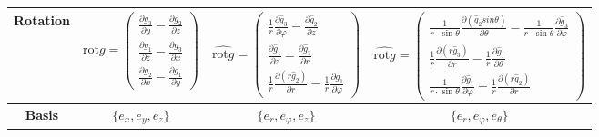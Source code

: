 \documentclass[6pt,a4paper]{scrartcl}
\begin{document}
\begin{center}
\begin{tabular}{|c|c|c|c|}
        \hline
        \textbf{Rotation}         & $\text{rot}g=\begin{pmatrix} \frac{\partial g_3}{\partial y}-\frac{\partial g_2}{\partial z} \\ \frac{\partial g_1}{\partial z}-\frac{\partial g_3}{\partial x} \\ \frac{\partial g_2}{\partial x}-\frac{\partial g_1}{\partial y} \end{pmatrix}$                                                                      & $\widehat{\text{rot}g}=\begin{pmatrix} \frac{1}{r}\frac{\partial\hat{g}_3}{\partial\varphi}-\frac{\partial\hat{g}_2}{\partial z} \\ \frac{\partial\hat{g}_1}{\partial z}-\frac{\partial\hat{g}_3}{\partial r} \\ \frac{1}{r}\frac{\partial(r\hat{g}_2)}{\partial r}-\frac{1}{r}\frac{\partial\hat{g}_1}{\partial\varphi} \end{pmatrix}$                                                                                                                                                                  & $\widehat{\text{rot}g}=\begin{pmatrix} \frac{1}{r\cdot\sin\theta}\frac{\partial(\hat{g}_2sin\theta)}{\partial\theta}-\frac{1}{r\cdot\sin\theta}\frac{\partial\hat{g}_3}{\partial\varphi} \\ \frac{1}{r}\frac{\partial(r\hat{g}_3)}{\partial r}-\frac{1}{r}\frac{\partial\hat{g}_1}{\partial\theta} \\ \frac{1}{r\cdot\sin\theta}\frac{\partial\hat{g}_1}{\partial\varphi}-\frac{1}{r}\frac{\partial(r\hat{g}_2)}{\partial r} \end{pmatrix}$                                                                                                                                                                                                                                                                     \\
        \hline
        \textbf{Basis}            & $\{e_x,e_y,e_z\}$                                                                                             & $\{e_r,e_\varphi,e_z\}$                                                                                                                                                                                             & $\{e_r,e_\varphi,e_\theta\}$                                                                                                                                                                                                                                                                                           \\
        \hline
    \end{tabular}
\end{center}
\end{document}
